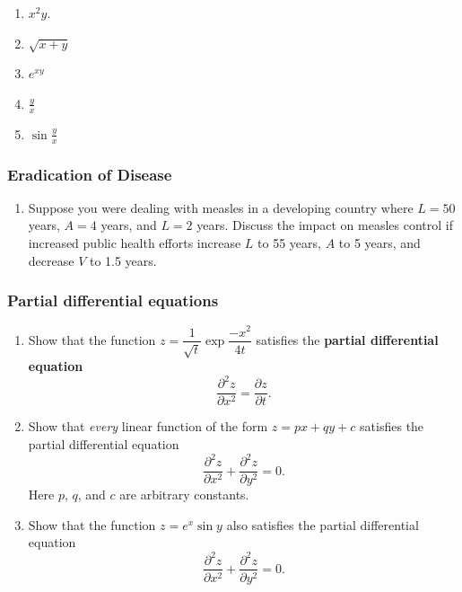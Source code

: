 \begin{enumerate}
  \begin{enumerate}
  \item $x^2 y$.

  \item $\sqrt{x + y}$

  \item $e^{xy}$

  \item $\displaystyle{\frac{y}{x}}$

  \item $\sin{\displaystyle{\frac{y}{x}}}$

\end{enumerate}
\end{enumerate}
\subsubsection{Eradication of Disease}
\label{subsubsec:eradication-of-disease}



\begin{enumerate}
\item Suppose you were dealing with measles in a developing country where $L = 50$ years, $A = 4$ years, and $L=2$ years.  Discuss the impact on measles control if increased public health efforts increase $L$ to  55 years, $A$ to 5 years, and decrease $V$ to 1.5 years.

\end{enumerate}
\subsubsection{Partial differential equations}
\label{subsubsec:partial-differential-equations}



\begin{enumerate}
\item Show that the function
$z = \dfrac{1}{\sqrt{t}}
\exp{\dfrac{-x^2}{4t}}$ satisfies the {\bf partial differential equation\/}
	\[
\dfrac{\partial ^2 z}{\partial x^2} = 
		\dfrac{\partial z}{\partial t}.
\]


\item Show that {\em every\/} linear function of the form
$z = px + qy + c$ satisfies the partial differential equation
	\[
\dfrac{\partial ^2 z}{\partial x^2} +
		\dfrac{\partial ^2 z}{\partial y^2} = 0.
\]
Here $p$, $q$, and $c$ are arbitrary constants.


\item Show that the function $z = e^x\sin{y}$ also satisfies the partial differential equation
	\[
\dfrac{\partial ^2 z}{\partial x^2} +
		\dfrac{\partial ^2 z}{\partial y^2} = 0.
\]



\end{enumerate}
